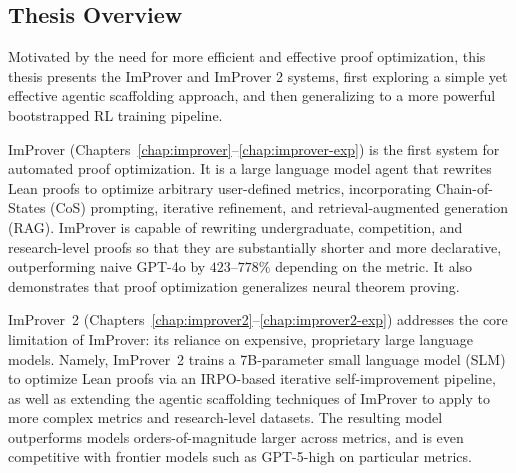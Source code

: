 \subsection{Thesis Overview}

Motivated by the need for more efficient and effective proof optimization, this thesis presents the ImProver and ImProver 2 systems, first exploring a simple yet effective agentic scaffolding approach, and then generalizing to a more powerful bootstrapped RL training pipeline.

ImProver (Chapters~\ref{chap:improver}--\ref{chap:improver-exp}) is the first system for automated proof optimization. It is a large language model agent that rewrites Lean proofs to optimize arbitrary user-defined metrics, incorporating Chain-of-States (CoS) prompting, iterative refinement, and retrieval-augmented generation (RAG). ImProver is capable of rewriting undergraduate, competition, and research-level proofs so that they are substantially shorter and more declarative, outperforming naive GPT-4o by $423$--$778\%$ depending on the metric. It also demonstrates that proof optimization generalizes neural theorem proving.

ImProver~2 (Chapters~\ref{chap:improver2}--\ref{chap:improver2-exp}) addresses the core limitation of ImProver: its reliance on expensive, proprietary large language models. Namely, ImProver~2 trains a 7B-parameter small language model (SLM) to optimize Lean proofs via an IRPO-based iterative self-improvement pipeline, as well as extending the agentic scaffolding techniques of ImProver to apply to more complex metrics and research-level datasets. The resulting model outperforms models orders-of-magnitude larger across metrics, and is even competitive with frontier models such as GPT-5-high on particular metrics.


